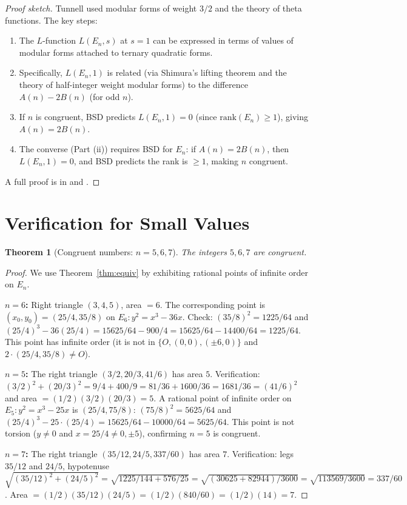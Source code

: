 \documentclass[12pt,a4paper]{amsart}
\newtheorem{theorem}{Theorem}[section]
\theoremstyle{definition}
\begin{document}
\begin{proof}[Proof sketch]
Tunnell \cite{Tunnell1983} used modular forms of weight $3/2$ and the theory
of theta functions.
The key steps:
\begin{enumerate}
  \item The $L$-function $L(E_n, s)$ at $s=1$ can be expressed in terms of
    values of modular forms attached to ternary quadratic forms.
  \item Specifically, $L(E_n, 1)$ is related (via Shimura's lifting theorem
    and the theory of half-integer weight modular forms) to the difference
    $A(n) - 2B(n)$ (for odd $n$).
  \item If $n$ is congruent, BSD predicts $L(E_n, 1) = 0$
    (since $\mathrm{rank}(E_n) \ge 1$), giving $A(n) = 2B(n)$.
  \item The converse (Part (ii)) requires BSD for $E_n$: if $A(n) = 2B(n)$,
    then $L(E_n,1) = 0$, and BSD predicts the rank is $\ge 1$, making $n$ congruent.
\end{enumerate}
A full proof is in \cite{Tunnell1983} and \cite{Koblitz1984}.
\end{proof}

\section{Verification for Small Values}

\begin{theorem}[Congruent numbers: $n = 5, 6, 7$]
\label{thm:small_examples}
The integers $5, 6, 7$ are congruent.
\end{theorem}

\begin{proof}
We use Theorem~\ref{thm:equiv} by exhibiting rational points of infinite
order on $E_n$.

\textbf{$n = 6$:} Right triangle $(3, 4, 5)$, area $= 6$.
The corresponding point is $(x_0, y_0) = (25/4, 35/8)$ on
$E_6: y^2 = x^3 - 36x$.
Check: $(35/8)^2 = 1225/64$ and $(25/4)^3 - 36(25/4) = 15625/64 - 900/4
= 15625/64 - 14400/64 = 1225/64$. \checkmark
This point has infinite order (it is not in $\{O,(0,0),(\pm 6,0)\}$
and $2 \cdot (25/4, 35/8) \ne O$).

\textbf{$n = 5$:} The right triangle $(3/2, 20/3, 41/6)$ has area $5$.
Verification: $(3/2)^2 + (20/3)^2 = 9/4 + 400/9 = 81/36 + 1600/36 = 1681/36 = (41/6)^2$
and area $= (1/2)(3/2)(20/3) = 5$.  \checkmark
A rational point of infinite order on $E_5: y^2 = x^3 - 25x$ is $(25/4, 75/8)$:
$(75/8)^2 = 5625/64$ and $(25/4)^3 - 25\cdot(25/4) = 15625/64 - 10000/64 = 5625/64$.
\checkmark
This point is not torsion ($y \ne 0$ and $x = 25/4 \ne 0, \pm 5$), confirming $n = 5$ is congruent.

\textbf{$n = 7$:} The right triangle $(35/12, 24/5, 337/60)$ has area $7$.
Verification: legs $35/12$ and $24/5$, hypotenuse $\sqrt{(35/12)^2 + (24/5)^2}
= \sqrt{1225/144 + 576/25} = \sqrt{(30625 + 82944)/3600} = \sqrt{113569/3600}
= 337/60$. Area $= (1/2)(35/12)(24/5) = (1/2)(840/60) = (1/2)(14) = 7$. \checkmark
\end{proof}
\end{document}
